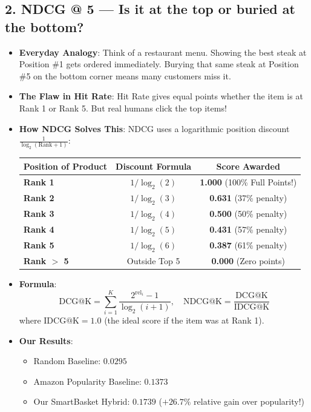 \documentclass[11pt,a4paper]{article}
\begin{document}
\subsection{2. NDCG @ 5 --- Is it at the top or buried at the bottom?}
\begin{itemize}
    \item \textbf{Everyday Analogy}: Think of a restaurant menu. Showing the best steak at Position \#1 gets ordered immediately. Burying that same steak at Position \#5 on the bottom corner means many customers miss it.
    \item \textbf{The Flaw in Hit Rate}: Hit Rate gives equal points whether the item is at Rank 1 or Rank 5. But real humans click the top items!
    \item \textbf{How NDCG Solves This}: NDCG uses a logarithmic position discount $\frac{1}{\log_2(\text{Rank} + 1)}$:
    \begin{center}
    \begin{tabular}{lcc}
        \toprule
        Position of Product & Discount Formula & Score Awarded \\
        \midrule
        \textbf{Rank 1} & $1 / \log_2(2)$ & \textbf{1.000} (100\% Full Points!) \\
        \textbf{Rank 2} & $1 / \log_2(3)$ & \textbf{0.631} (37\% penalty) \\
        \textbf{Rank 3} & $1 / \log_2(4)$ & \textbf{0.500} (50\% penalty) \\
        \textbf{Rank 4} & $1 / \log_2(5)$ & \textbf{0.431} (57\% penalty) \\
        \textbf{Rank 5} & $1 / \log_2(6)$ & \textbf{0.387} (61\% penalty) \\
        \textbf{Rank $>$ 5} & Outside Top 5 & \textbf{0.000} (Zero points) \\
        \bottomrule
    \end{tabular}
    \end{center}
    \item \textbf{Formula}:
    \begin{equation}
        \text{DCG@K} = \sum_{i=1}^{K} \frac{2^{\text{rel}_i} - 1}{\log_2(i + 1)}, \quad \text{NDCG@K} = \frac{\text{DCG@K}}{\text{IDCG@K}}
    \end{equation}
    where $\text{IDCG@K} = 1.0$ (the ideal score if the item was at Rank 1).
    \item \textbf{Our Results}:
    \begin{itemize}[noitemsep]
        \item Random Baseline: $0.0295$
        \item Amazon Popularity Baseline: $0.1373$
        \item Our SmartBasket Hybrid: $\mathbf{0.1739}$ ($+26.7\%$ relative gain over popularity!)
    \end{itemize}
\end{itemize}
\end{document}
